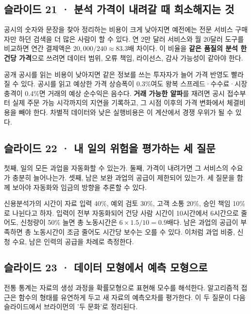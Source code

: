 \documentclass[11pt,a4paper]{article}
\begin{document}
\subsection{슬라이드 21 · 분석 가격이 내려갈 때 희소해지는 것}
공시의 숫자와 문장을 찾아 정리하는 비용이 크게 낮아지면 예전에는 전문 서비스 구매자만 하던 검색을 더 많은 사람이 할 수 있다. 연 2만 달러 서비스와 월 20달러 도구를 비교하면 연간 결제액은 $20{,}000/240\approx83.3$배 차이다. 이 비율을 \textbf{같은 품질의 분석 한 건당 가격}으로 쓰려면 데이터 범위, 오류 책임, 라이선스, 감사 가능성이 같아야 한다.\par

공개 공시를 읽는 비용이 낮아지면 같은 정보를 쓰는 투자자가 늘어 가격 반영도 빨라질 수 있다. 공시를 읽고 예상한 가격 상승폭이 0.3\%여도 왕복 스프레드·수수료·시장충격이 0.4\%면 거래의 예상 순수익은 음수다. \textbf{거래 가능한 알파}를 재려면 공시 접수부터 실제 주문 가능 시각까지의 지연을 기록하고, 그 시점 이후의 가격 변화에서 체결비용을 빼야 한다. 차별적 데이터와 낮은 실행비용은 이 계산에서 경쟁 우위가 될 수 있다.\par

\subsection{슬라이드 22 · 내 일의 위험을 평가하는 세 질문}
첫째, 일의 모든 과업을 자동화할 수 있는가. 둘째, 가격이 내려가면 그 서비스의 수요가 충분히 늘어나는가. 셋째, 남은 보완 과업의 공급이 제한되어 있는가. 세 질문을 함께 보아야 자동화와 임금의 방향을 추론할 수 있다.\par

신용분석가의 시간이 자료 입력 40\%, 예외 검토 30\%, 고객 소통 20\%, 승인 책임 10\%로 나뉜다고 하자. 입력이 전부 자동화되어 건당 사람 시간이 10시간에서 6시간으로 줄어도, 신청량이 50\% 늘면 총 노동시간은 $6\times1.5/10=0.9$배다. 남은 과업의 공급이 부족하면 총 노동시간이 조금 줄어도 시간당 보수는 오를 수 있다. 이처럼 과업 비중, 신청 수요, 남은 인력의 공급을 차례로 측정한다.\par

\subsection{슬라이드 23 · 데이터 모형에서 예측 모형으로}
전통 통계는 자료의 생성 과정을 확률모형으로 표현해 모수를 해석한다. 알고리즘적 접근은 함수의 형태를 유연하게 두고 새 자료의 예측오차를 평가한다. 이 두 질문이 다음 슬라이드에서 브라이먼의 '두 문화'로 정리된다.\par
\end{document}
